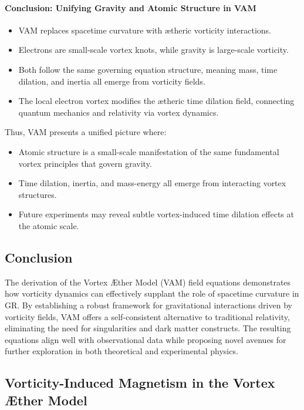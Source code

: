 \documentclass[a4paper,10pt]{article}
\begin{document}
\paragraph{Conclusion: Unifying Gravity and Atomic Structure in VAM}
\begin{itemize}
    \item VAM replaces spacetime curvature with ætheric vorticity interactions.
    \item Electrons are small-scale vortex knots, while gravity is large-scale vorticity.
    \item Both follow the same governing equation structure, meaning mass, time dilation, and inertia all emerge from vorticity fields.
    \item The local electron vortex modifies the ætheric time dilation field, connecting quantum mechanics and relativity via vortex dynamics.
\end{itemize}
Thus, VAM presents a unified picture where:
\begin{itemize}
    \item Atomic structure is a small-scale manifestation of the same fundamental vortex principles that govern gravity.
    \item Time dilation, inertia, and mass-energy all emerge from interacting vortex structures.
    \item Future experiments may reveal subtle vortex-induced time dilation effects at the atomic scale.
\end{itemize}

\subsection{Conclusion}
The derivation of the Vortex Æther Model (VAM) field equations demonstrates how vorticity dynamics can effectively supplant the role of spacetime curvature in GR. By establishing a robust framework for gravitational interactions driven by vorticity fields, VAM offers a self-consistent alternative to traditional relativity, eliminating the need for singularities and dark matter constructs. The resulting equations align well with observational data while proposing novel avenues for further exploration in both theoretical and experimental physics.


\subsection{Vorticity-Induced Magnetism in the Vortex Æther Model}
\end{document}
